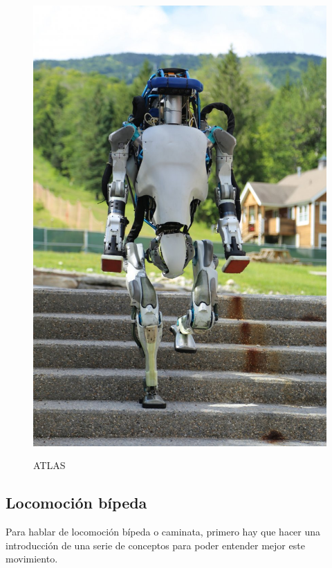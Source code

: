 \begin{figure}[H]
\centering
{\includegraphics[scale=0.2]{imagenes/apartado_2/214_atlas_boston_dynamics}}
\caption{ATLAS}
\label{figura214}
\end{figure}

\newpage

\subsection{Locomoción bípeda}
Para hablar de locomoción bípeda o caminata, primero hay que hacer una introducción de una serie de conceptos para poder entender mejor este movimiento.


